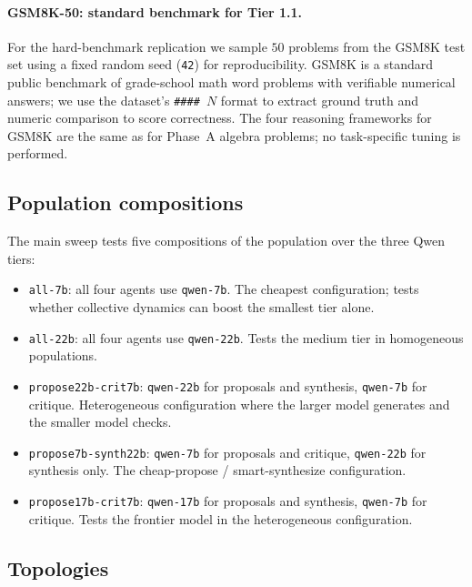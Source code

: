 \documentclass[11pt]{amsart}
\newcommand\1{{\mathds{1}}}
\theoremstyle{definition}
\theoremstyle{remark}
\numberwithin{equation}{section}
\begin{document}
\paragraph{GSM8K-50: standard benchmark for Tier 1.1.}
For the hard-benchmark replication we sample $50$ problems from the GSM8K test set \cite{Cobbe2021GSM8K} using a fixed random seed (\texttt{42}) for reproducibility.
GSM8K is a standard public benchmark of grade-school math word problems with verifiable numerical answers; we use the dataset's \texttt{\#\#\#\#~$N$} format to extract ground truth and numeric comparison to score correctness.
The four reasoning frameworks for GSM8K are the same as for Phase~A algebra problems; no task-specific tuning is performed.

\subsection{Population compositions}\label{app:configs}

The main sweep tests five compositions of the population over the three Qwen tiers:
\begin{itemize}[leftmargin=1.2em, itemsep=2pt]
\item \texttt{all-7b}: all four agents use \texttt{qwen-7b}. The cheapest configuration; tests whether collective dynamics can boost the smallest tier alone.
\item \texttt{all-22b}: all four agents use \texttt{qwen-22b}. Tests the medium tier in homogeneous populations.
\item \texttt{propose22b-crit7b}: \texttt{qwen-22b} for proposals and synthesis, \texttt{qwen-7b} for critique. Heterogeneous configuration where the larger model generates and the smaller model checks.
\item \texttt{propose7b-synth22b}: \texttt{qwen-7b} for proposals and critique, \texttt{qwen-22b} for synthesis only. The cheap-propose / smart-synthesize configuration.
\item \texttt{propose17b-crit7b}: \texttt{qwen-17b} for proposals and synthesis, \texttt{qwen-7b} for critique. Tests the frontier model in the heterogeneous configuration.
\end{itemize}

\subsection{Topologies}\label{app:topologies}
\end{document}
